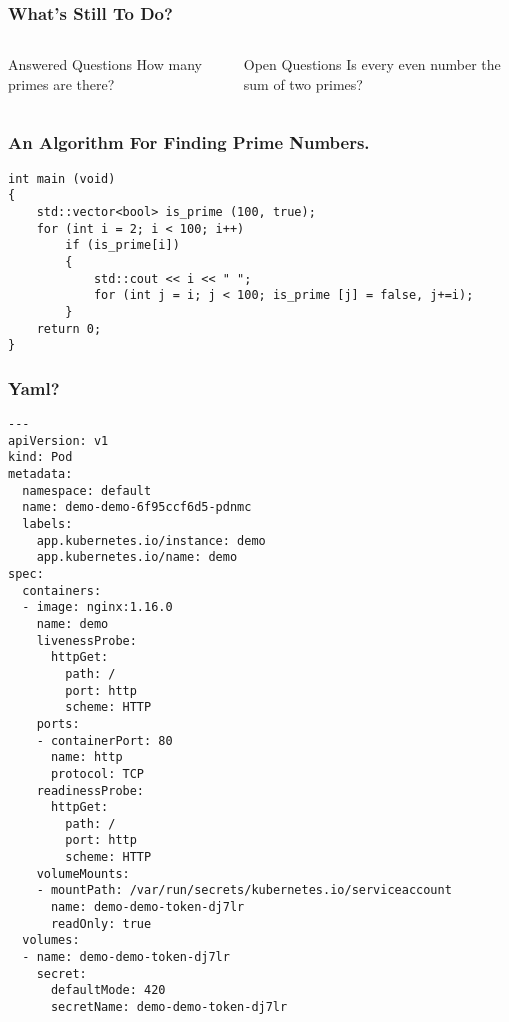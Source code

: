 \documentclass{beamer}
\begin{document}
\begin{frame}
\frametitle{What’s Still To Do?}
\begin{columns}
    \begin{block}{Answered Questions}
        How many primes are there?
    \end{block}
    \begin{block}{Open Questions}
        Is every even number the sum of two primes?
    \end{block}
\end{columns}
\end{frame}

\begin{frame}[fragile]
\frametitle{An Algorithm For Finding Prime Numbers.}
\begin{verbatim}
int main (void)
{
    std::vector<bool> is_prime (100, true);
    for (int i = 2; i < 100; i++)
        if (is_prime[i])
        {
            std::cout << i << " ";
            for (int j = i; j < 100; is_prime [j] = false, j+=i);
        }
    return 0;
}
\end{verbatim}
\end{frame}

\begin{frame}[fragile]
\frametitle{Yaml?}
\begin{verbatim}
---
apiVersion: v1
kind: Pod
metadata:
  namespace: default
  name: demo-demo-6f95ccf6d5-pdnmc
  labels:
    app.kubernetes.io/instance: demo
    app.kubernetes.io/name: demo
spec:
  containers:
  - image: nginx:1.16.0
    name: demo
    livenessProbe:
      httpGet:
        path: /
        port: http
        scheme: HTTP
    ports:
    - containerPort: 80
      name: http
      protocol: TCP
    readinessProbe:
      httpGet:
        path: /
        port: http
        scheme: HTTP
    volumeMounts:
    - mountPath: /var/run/secrets/kubernetes.io/serviceaccount
      name: demo-demo-token-dj7lr
      readOnly: true
  volumes:
  - name: demo-demo-token-dj7lr
    secret:
      defaultMode: 420
      secretName: demo-demo-token-dj7lr

\end{verbatim}
\end{frame}
\end{document}
